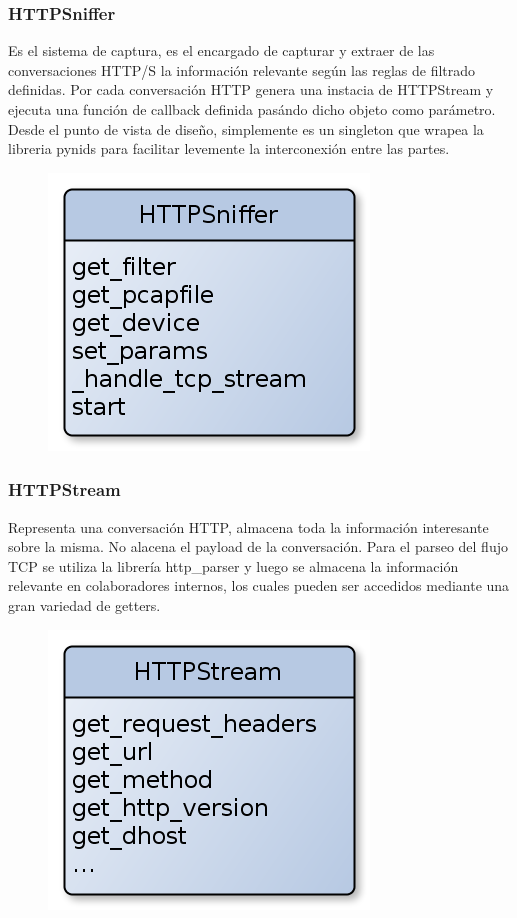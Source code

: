 \subsubsection{HTTPSniffer}

Es el sistema de captura, es el encargado de capturar y extraer de las conversaciones HTTP/S la información relevante según las reglas de filtrado definidas. Por cada conversación HTTP genera una instacia de HTTPStream y ejecuta una función de callback definida pasándo dicho objeto como parámetro. Desde el punto de vista de diseño, simplemente es un singleton que wrapea la libreria pynids para facilitar levemente la interconexión entre las partes.

\begin{figure}[hbtp]
    \centering
	\includegraphics[scale=0.40]{img/HTTPSniffer.png} 
\end{figure}

\subsubsection{HTTPStream}

Representa una conversación HTTP, almacena toda la información interesante sobre la misma. No alacena el payload de la conversación. Para el parseo del flujo TCP se utiliza la librería http\_parser y luego se almacena la información relevante en colaboradores internos, los cuales pueden ser accedidos mediante una gran variedad de getters.

\begin{figure}[hbtp]
    \centering
	\includegraphics[scale=0.40]{img/HTTPStream.png} 
\end{figure}

